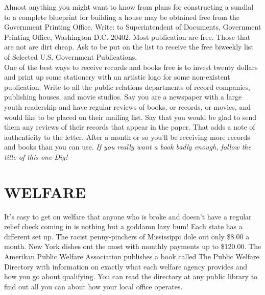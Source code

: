\documentclass[11pt,twoside,a4paper]{book}
\begin{document}
Almost anything you might want to know from plans for constructing a sundial to a complete blueprint for building a house may be obtained free from the Government Printing Office. Write: to Superintendent of Documents, Government Printing Office, Washington D.C. 20402. Most publication are free. Those that are not are dirt cheap. Ask to be put on the list to receive the free biweekly list of Selected U.S. Government Publications.~\\

One of the best ways to receive records and books free is to invest twenty dollars and print up some stationery with an artistic logo for some non-existent publication. Write to all the public relations departments of record companies, publishing houses, and movie studios. Say you are a newspaper with a large youth readership and have regular reviews of books, or records, or movies, and would like to be placed on their mailing list. Say that you would be glad to send them any reviews of their records that appear in the paper. That adds a note of authenticity to the letter. After a month or so you'll be receiving more records and books than you can use. \emph{If you really want a book badly enough, follow the title of this one-Dig! }



\section{WELFARE}

It's easy to get on welfare that anyone who is broke and doesn't have a regular relief check coming in is nothing but a goddamn lazy bum! Each state has a different set up. The racist penny-pinchers of Mississippi dole out only \$8.00 a month. New York dishes ont the most with monthly payments up to \$120.00. The Amerikan Public Welfare Association publishes a book called The Public Welfare Directory with information on exactly what each welfare agency provides and how you go about qualifying. You can read the directory at any public library to find out all you can about how your local office operates.~\\
\end{document}
